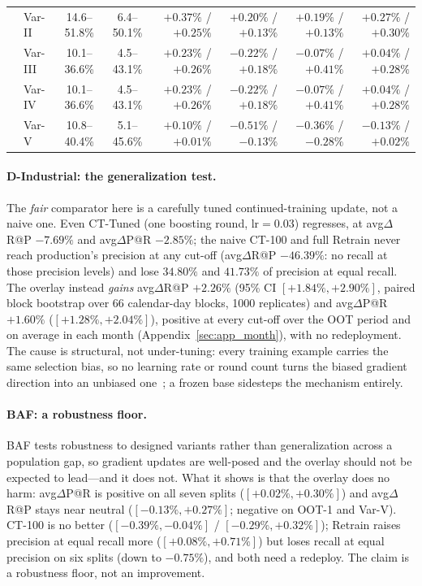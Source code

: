 \documentclass[11pt]{article}
\begin{document}
\begin{table}[t]
{\begin{tabular}{@{}ll cc rrrr@{}}
     & Var-II & 14.6--51.8\% & 6.4--50.1\% & $+0.37\%$ / $+0.25\%$ & $+0.20\%$ / $+0.13\%$ & $+0.19\%$ / $+0.13\%$ & $\mathbf{+0.27\%}$ / $\mathbf{+0.30\%}$ \\
     & Var-III & 10.1--36.6\% & 4.5--43.1\% & $+0.23\%$ / $+0.26\%$ & $-0.22\%$ / $+0.18\%$ & $-0.07\%$ / $+0.41\%$ & $\mathbf{+0.04\%}$ / $\mathbf{+0.28\%}$ \\
     & Var-IV & 10.1--36.6\% & 4.5--43.1\% & $+0.23\%$ / $+0.26\%$ & $-0.22\%$ / $+0.18\%$ & $-0.07\%$ / $+0.41\%$ & $\mathbf{+0.04\%}$ / $\mathbf{+0.28\%}$ \\
     & Var-V & 10.8--40.4\% & 5.1--45.6\% & $+0.10\%$ / $+0.01\%$ & $-0.51\%$ / $-0.13\%$ & $-0.36\%$ / $-0.28\%$ & $-0.13\%$ / $\mathbf{+0.02\%}$ \\
    \bottomrule
  \end{tabular}%
  }
\end{table}

\paragraph{D-Industrial: the generalization test.}
The \emph{fair} comparator here is a carefully tuned continued-training update, not a naive one. Even
CT-Tuned (one boosting round, lr$=$0.03) regresses, at avg$\Delta$R@P $-7.69\%$ and avg$\Delta$P@R
$-2.85\%$; the naive CT-100 and full Retrain never reach production's precision at any cut-off (avg$\Delta$R@P $-46.39\%$: no recall at those precision levels) and lose $34.80\%$ and $41.73\%$ of precision at equal recall. The overlay instead
\emph{gains} avg$\Delta$R@P $+2.26\%$ (95\% CI $[+1.84\%,+2.90\%]$, paired block bootstrap
over 66 calendar-day blocks, 1000 replicates) and avg$\Delta$P@R $+1.60\%$
($[+1.28\%,+2.04\%]$), positive at every cut-off over the OOT period and on average in each month
(Appendix~\ref{sec:app_month}), with no redeployment. The cause
is structural, not under-tuning: every training example carries the same selection bias, so no
learning rate or round count turns the biased gradient direction into an unbiased
one~\citep{quinonero2009shift}; a frozen base sidesteps the mechanism entirely.

\paragraph{BAF: a robustness floor.}
BAF tests robustness to designed variants rather than generalization across a population gap, so
gradient updates are well-posed and the overlay should not be expected to lead---and it does not.
What it shows is that the overlay does no harm: avg$\Delta$P@R is positive on all seven splits
($[+0.02\%,+0.30\%]$) and avg$\Delta$R@P stays near neutral ($[-0.13\%,+0.27\%]$;
negative on OOT-1 and Var-V). CT-100 is no better ($[-0.39\%,-0.04\%]$ / $[-0.29\%,+0.32\%]$); Retrain raises precision at equal recall more ($[+0.08\%,+0.71\%]$) but loses recall at equal precision on six splits (down to $-0.75\%$), and both need a redeploy. The claim is a
robustness floor, not an improvement.
\end{document}
